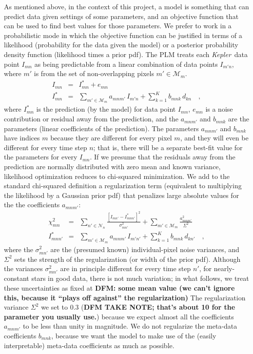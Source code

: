 \documentclass[12pt, preprint]{aastex}
\newcommand{\project}[1]{\textsl{#1}}
\newcommand{\Kepler}{\project{Kepler}}
\newcommand{\set}[1]{\mathcal{#1}}
\newcommand{\todo}[1]{\textbf{#1}}
\begin{document}
As mentioned above, in the context of this project,
  a model is something that can predict data given settings of some parameters,
  and an objective function that can be used to find best values for those parameters.
We prefer to work in a probabilistic mode in which the objective function can be justified
  in terms of a likelihood (probability for the data given the model)
  or a posterior probability density function (likelihood times a prior pdf).
The PLM treats each \Kepler\ data point $I_{mn}$ as being
  predictable from a linear combination of data points $I_{m'n}$,
  where $m'$ is from the set of non-overlapping pixels $m'\in\set{M}_m$.
\begin{eqnarray}
I_{mn}         &=& I^{\ast}_{mn} + e_{mn}
\\
I^{\ast}_{mn}  &=& \sum_{m'\in\set{M}_m} a_{mnm'}\,I_{m'n} + \sum_{k=1}^{K} b_{mnk}\,d_{kn}
\quad,
\end{eqnarray}
where $I^{\ast}_{mn}$ is the prediction (by the model) for data point $I_{mn}$,
  $e_{mn}$ is a noise contribution or residual away from the prediction,
  and the $a_{mnm'}$ and $b_{mnk}$ are the parameters (linear coefficients of the prediction).
The parameters $a_{mnm'}$ and $b_{mnk}$ have indices $m$ because
  they are different for every pixel $m$,
  and they will even be different for every time step $n$;
  that is, there will be a separate best-fit value for the parameters for every $I_{mn}$.
If we presume that the residuals away from the prediction are normally distributed with zero mean
  and known variance,
  likelihood optimization reduces to chi-squared minimization.
We add to the standard chi-squared definition a regularization term
  (equivalent to multiplying the likelihood by a Gaussian prior pdf)
  that penalizes large absolute values for the the coefficients $a_{mnm'}$:
\begin{eqnarray}
\chi^2_{mn}    &=& \sum_{n'\in\set{N}_n} \frac{[I_{mn'} - I^{\ast}_{mnn'}]^2}{\sigma^2_{mn'}}
                 + \sum_{m'\in\set{M}_m} \frac{a_{mnm'}^2}{\Sigma^2}
\\
I^{\ast}_{mnn'} &=& \sum_{m'\in\set{M}_m} a_{mnm'}\,I_{m'n'} + \sum_{k=1}^{K} b_{mnk}\,d_{kn'}
\quad,
\end{eqnarray}
where the $\sigma^2_{mn'}$ are the (presumed known) individual-pixel noise variances,
  and $\Sigma^2$ sets the strength of the regularization (or width of the prior pdf).
Although the variances $\sigma^2_{mn'}$ are in principle different for every time step $n'$,
  for nearly-constant stars in good data, there is not much variation;
  in what follows, we treat these uncertainties as fixed at
  \todo{DFM: some mean value (we can't ignore this,
   because it ``plays off against'' the regularization)}
The regularization variance $\Sigma^2$ we set to 0.3 (\todo{DFM TAKE NOTE; that's about 10 for the parameter you usually use.})
  because we expect almost all the coefficients $a_{mnm'}$ to be less than unity in magnitude.
We do not regularize the meta-data coefficients $b_{mnk}$,
  because we want the model to make use of the (easily interpretable) meta-data coefficients as much as possible.
\end{document}
